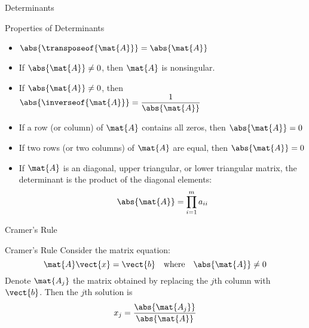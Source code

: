 \documentclass{beamer}
\begin{document}
\begin{frame}{Determinants}
\begin{block}{Properties of Determinants}
\begin{itemize}
\item<+-> $\abs{\transposeof{\mat{A}}}=\abs{\mat{A}}$
\item<+-> If $\abs{\mat{A}}\neq 0$, then $\mat{A}$ is nonsingular.
\item<+-> If $\abs{\mat{A}}\neq 0$, then $\abs{\inverseof{\mat{A}}}=\dfrac{1}{\abs{\mat{A}}}$
\item<+-> If a row (or column) of $\mat{A}$ contains all zeros, then $\abs{\mat{A}}=0$
\item<+-> If two rows (or two columns) of $\mat{A}$ are equal, then $\abs{\mat{A}}=0$
\item<+-> If $\mat{A}$ is an diagonal, upper triangular, or lower triangular matrix, the determinant is the product of the diagonal elements:
\begin{equation*}
\abs{\mat{A}}=\prod_{i=1}^{m} a_{ii}
\end{equation*}
\end{itemize}
\end{block}
\end{frame}

\begin{frame}{Cramer's Rule}
\begin{block}{Cramer's Rule}
Consider the matrix equation:
\begin{equation*}
\mat{A}\vect{x}=\vect{b}\quad \text{where}\quad\abs{\mat{A}}\neq0
\end{equation*}
Denote $\mat{A_j}$ the matrix obtained by replacing the $j$th column with $\vect{b}$. Then the $j$th solution is
\begin{equation*}
x_j = \dfrac{\abs{\mat{A_j}}}{\abs{\mat{A}}}
\end{equation*}
\end{block}
\end{frame}
\end{document}

